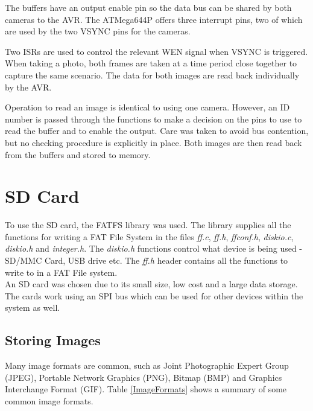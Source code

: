The buffers have an output enable pin so the data bus can be shared by both cameras to the AVR. The ATMega644P offers three interrupt pins, two of which are used by the two VSYNC pins for the cameras.

Two ISRs are used to control the relevant WEN signal when VSYNC is triggered. When taking a photo, both frames are taken at a time period close together to capture the same scenario. The data for both images are read back individually by the AVR. 

Operation to read an image is identical to using one camera. However, an ID number is passed through the functions to make a decision on the pins to use to read the buffer and to enable the output. Care was taken to avoid bus contention, but no checking procedure is explicitly in place. Both images are then read back from the buffers and stored to memory. 

\section{SD Card} \label{sect:SDCard}

To use the SD card, the FATFS library \citep{FATFS} was used. The library supplies all the functions for writing a FAT File System in the files \textit{ff.c}, \textit{ff.h}, \textit{ffconf.h}, \textit{diskio.c}, \textit{diskio.h} and \textit{integer.h}. The \textit{diskio.h} functions control what device is being used - SD/MMC Card, USB drive etc. The \textit{ff.h} header contains all the functions to write to in a FAT File system. 
\\
An SD card was chosen due to its small size, low cost and a large data storage. The cards work using an SPI bus which can be used for other devices within the system as well. 

\subsection{Storing Images}

Many image formats are common, such as Joint Photographic Expert Group (JPEG), Portable Network Graphics (PNG), Bitmap (BMP) and Graphics Interchange Format (GIF). Table \ref{ImageFormats} shows a summary of some common image formats.


